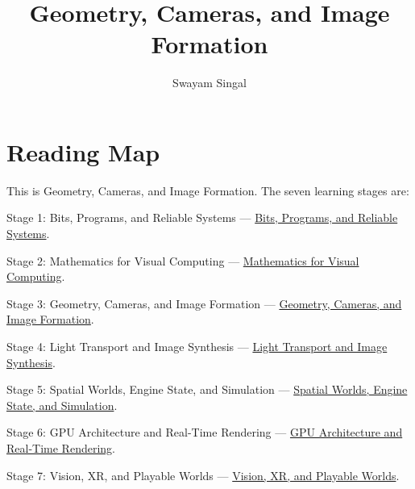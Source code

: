 \documentclass[11pt,twoside,openany]{book}
\title{Geometry, Cameras, and Image Formation}
\author{Swayam Singal}
\begin{document}
\maketitle
\begin{center}\end{center}
\hypertarget{volume-reading-map}{}
\chapter*{Reading Map}
\noindent This is Geometry, Cameras, and Image Formation. The seven learning stages are:
\par\noindent Stage 1: Bits, Programs, and Reliable Systems --- \href{../01-Bits-Programs-and-Reliable-Systems/main.pdf}{Bits, Programs, and Reliable Systems}.
\par\noindent Stage 2: Mathematics for Visual Computing --- \href{../02-Mathematics-for-Visual-Computing/main.pdf}{Mathematics for Visual Computing}.
\par\noindent Stage 3: Geometry, Cameras, and Image Formation --- \href{../03-Geometry-Cameras-and-Image-Formation/main.pdf}{Geometry, Cameras, and Image Formation}.
\par\noindent Stage 4: Light Transport and Image Synthesis --- \href{../04-Light-Transport-and-Image-Synthesis/main.pdf}{Light Transport and Image Synthesis}.
\par\noindent Stage 5: Spatial Worlds, Engine State, and Simulation --- \href{../05-Spatial-Worlds-Engine-State-and-Simulation/main.pdf}{Spatial Worlds, Engine State, and Simulation}.
\par\noindent Stage 6: GPU Architecture and Real-Time Rendering --- \href{../06-GPU-Architecture-and-Real-Time-Rendering/main.pdf}{GPU Architecture and Real-Time Rendering}.
\par\noindent Stage 7: Vision, XR, and Playable Worlds --- \href{../07-Vision-XR-and-Playable-Worlds/main.pdf}{Vision, XR, and Playable Worlds}.
\tableofcontents
\mainmatter
\setcounter{chapter}{0}






\end{document}
